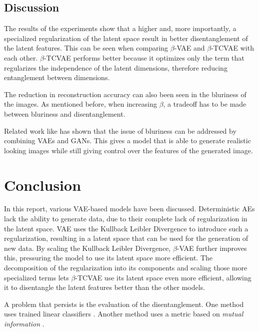 \documentclass[a4paper]{IEEEtran}
\begin{document}
\subsection{Discussion}
The results of the experiments show that a higher and, more importantly, a specialized regularization of the latent space result in better disentanglement of the latent features. This can be seen when comparing $\beta$-VAE and $\beta$-TCVAE with each other. $\beta$-TCVAE performs better because it optimizes only the term that regularizes the independence of the latent dimensions, therefore reducing entanglement between dimensions.

The reduction in reconstruction accuracy can also been seen in the bluriness of the images. As mentioned before, when increasing $\beta$, a tradeoff has to be made between bluriness and disentanglement.

Related work like \cite{DBLP:journals/corr/BaoCWLH17} has shown that the issue of bluriness can be addressed by combining VAEs and GANs. This gives a model that is able to generate realistic looking images while still giving control over the features of the generated image.

\section{Conclusion}
In this report, various VAE-based models have been discussed. Deterministic AEs lack the ability to generate data, due to their complete lack of regularization in the latent space. VAE uses the Kullback Leibler Divergence to introduce such a regularization, resulting in a latent space that can be used for the generation of new data. By scaling the Kullback Leibler Divergence, $\beta$-VAE further improves this, pressuring the model to use its latent space more efficient. The decomposition of the regularization into its components and scaling those more specialized terms lets $\beta$-TCVAE use its latent space even more efficient, allowing it to disentangle the latent features better than the other models.

A problem that persists is the evaluation of the disentanglement. One method uses trained linear classifiers \cite{higgins2017vae}. Another method uses a metric based on \textit{mutual information} \cite{chen2019isolating}.



\end{document}

